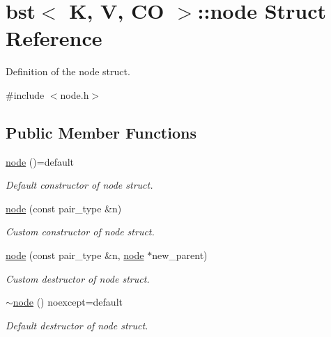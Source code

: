 \hypertarget{structbst_1_1node}{}\section{bst$<$ K, V, CO $>$\+:\+:node Struct Reference}
\label{structbst_1_1node}


Definition of the node struct.  




{\ttfamily \#include $<$node.\+h$>$}

\subsection*{Public Member Functions}
\begin{DoxyCompactItemize}
\item 
\mbox{\label{structbst_1_1node_a66d903f45fa31e3b8bc7e8bd56003349}} 
\hyperlink{structbst_1_1node_a66d903f45fa31e3b8bc7e8bd56003349}{node} ()=default
\begin{DoxyCompactList}\small\item\em Default constructor of node struct. \end{DoxyCompactList}\item 
\hyperlink{structbst_1_1node_a02192633338afde3104d8036748dcbe9}{node} (const pair\+\_\+type \&n)
\begin{DoxyCompactList}\small\item\em Custom constructor of node struct. \end{DoxyCompactList}\item 
\hyperlink{structbst_1_1node_abd29bdf9f83aedca2dd04264d61624d4}{node} (const pair\+\_\+type \&n, \hyperlink{structbst_1_1node}{node} $\ast$new\+\_\+parent)
\begin{DoxyCompactList}\small\item\em Custom destructor of node struct. \end{DoxyCompactList}\item 
\mbox{\label{structbst_1_1node_a80c9e025d6735588e79d8de5042a8ceb}} 
\hyperlink{structbst_1_1node_a80c9e025d6735588e79d8de5042a8ceb}{$\sim$node} () noexcept=default
\begin{DoxyCompactList}\small\item\em Default destructor of node struct. \end{DoxyCompactList}\item 

\end{DoxyCompactItemize}
